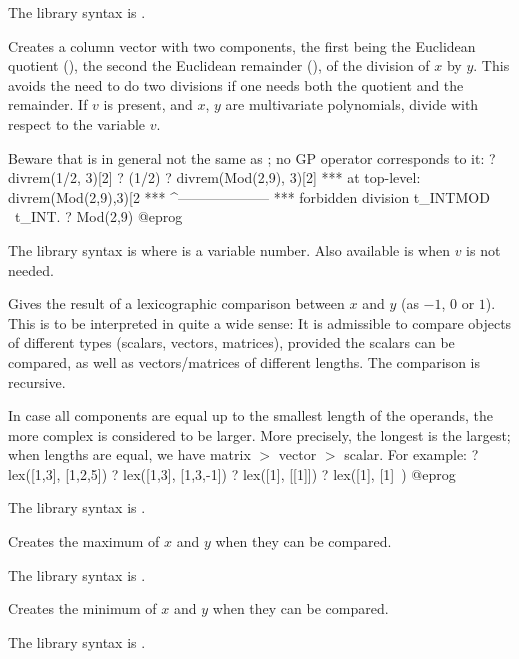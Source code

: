 The library syntax is .

\label{se:divrem}
Creates a column vector with two components, the first being the Euclidean
quotient (), the second the Euclidean remainder
(), of the division of $x$ by $y$. This avoids the
need to do two divisions if one needs both the quotient and the remainder.
If $v$ is present, and $x$, $y$ are multivariate
polynomials, divide with respect to the variable $v$.

Beware that  is in general not the same as
; no GP operator corresponds to it:
\bprog
? divrem(1/2, 3)[2]
? (1/2) %
? divrem(Mod(2,9), 3)[2]
 ***   at top-level: divrem(Mod(2,9),3)[2
 ***                 ^--------------------
 ***   forbidden division t_INTMOD \ t_INT.
? Mod(2,9) %
@eprog

The library syntax is  where  is a variable number.
Also available is  when $v$ is
not needed.

\label{se:lex}
Gives the result of a lexicographic comparison
between $x$ and $y$ (as $-1$, $0$ or $1$). This is to be interpreted in quite
a wide sense: It is admissible to compare objects of different types
(scalars, vectors, matrices), provided the scalars can be compared, as well
as vectors/matrices of different lengths. The comparison is recursive.

In case all components are equal up to the smallest length of the operands,
the more complex is considered to be larger. More precisely, the longest is
the largest; when lengths are equal, we have matrix $>$ vector $>$ scalar.
For example:
\bprog
? lex([1,3], [1,2,5])
? lex([1,3], [1,3,-1])
? lex([1], [[1]])
? lex([1], [1]~)
@eprog

The library syntax is .

\label{se:max}
Creates the maximum of $x$ and $y$ when they can be compared.

The library syntax is .

\label{se:min}
Creates the minimum of $x$ and $y$ when they can be compared.

The library syntax is .

